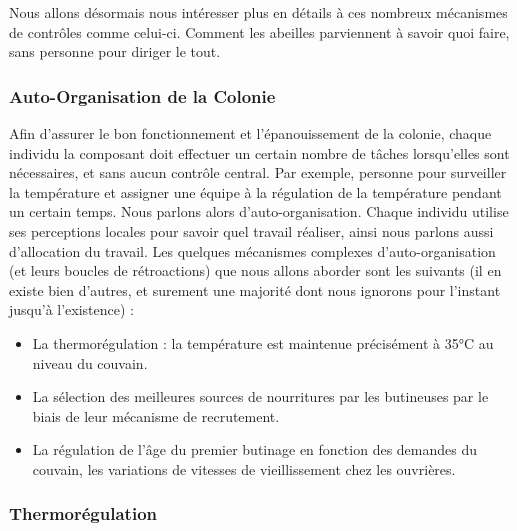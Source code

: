 			Nous allons désormais nous intéresser plus en détails à ces nombreux mécanismes de contrôles comme celui-ci. Comment les abeilles parviennent à savoir quoi faire, sans personne pour diriger le tout.
			
		\subsubsection{Auto-Organisation de la Colonie}
			Afin d'assurer le bon fonctionnement et l'épanouissement de la colonie, chaque individu la composant doit effectuer un certain nombre de tâches lorsqu'elles sont nécessaires, et sans aucun contrôle central. Par exemple, personne pour surveiller la température et assigner une équipe à la régulation de la température pendant un certain temps. Nous parlons alors d'auto-organisation. Chaque individu utilise ses perceptions locales pour savoir quel travail réaliser, ainsi nous parlons aussi d'allocation du travail. Les quelques mécanismes complexes d'auto-organisation (et leurs boucles de rétroactions) que nous allons aborder sont les suivants (il en existe bien d'autres, et surement une majorité dont nous ignorons pour l'instant jusqu'à l'existence) :
			
			
			\begin{itemize}
				\item La thermorégulation : la température est maintenue précisément à 35°C au niveau du couvain.
				\item La sélection des meilleures sources de nourritures par les butineuses par le biais de leur mécanisme de recrutement.
				\item La régulation de l'âge du premier butinage en fonction des demandes du couvain, les variations de vitesses de vieillissement chez les ouvrières.
			\end{itemize}

			\subsubsection{Thermorégulation}	
			
